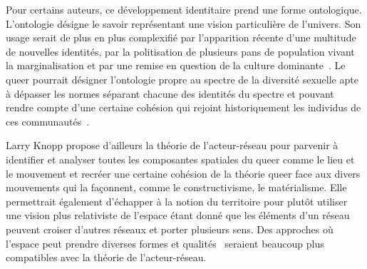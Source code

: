 Pour certains auteurs, ce développement identitaire prend une forme ontologique.
L'ontologie désigne le savoir représentant une vision particulière de l'univers. 
Son usage serait de plus en plus complexifié par l'apparition récente d'une multitude de nouvelles identités, par la politisation de plusieurs pans de population vivant la marginalisation et par une remise en question de la culture dominante~\citep[122]{Knopp2004}. 
Le queer pourrait désigner l'ontologie propre au spectre de la diversité sexuelle apte à dépasser les normes séparant chacune des identités du spectre \lgbt{} et pouvant rendre compte d'une certaine cohésion qui rejoint historiquement les individus de ces communautés~\citep[122]{Knopp2004}.

Larry Knopp propose d'ailleurs la théorie de l'acteur-réseau pour parvenir à identifier et analyser toutes les composantes spatiales du queer comme le lieu et le mouvement et recréer une certaine cohésion de la théorie queer face aux divers mouvements qui la façonnent, comme le constructivisme, le matérialisme. 
Elle permettrait également d'échapper à la notion du territoire pour plutôt utiliser une vision plus relativiste de l'espace étant donné que les éléments d'un réseau peuvent croiser d'autres réseaux et porter plusieurs sens. 
Des approches où l'espace peut prendre diverses formes et qualités~\citep{DiMeo1998} seraient beaucoup plus compatibles avec la théorie de l'acteur-réseau.

